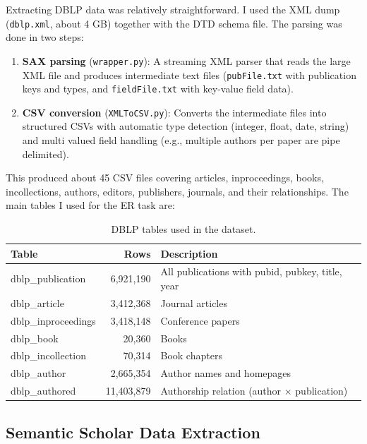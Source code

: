 \documentclass{article}
\begin{document}
Extracting DBLP data was relatively straightforward.
I used the XML dump (\texttt{dblp.xml}, about 4 GB) together with the DTD schema file.
The parsing was done in two steps:

\begin{enumerate}
    \item \textbf{SAX parsing} (\texttt{wrapper.py}): A streaming XML parser that reads the large XML file and produces intermediate text files (\texttt{pubFile.txt} with publication keys and types, and \texttt{fieldFile.txt} with key-value field data).
    \item \textbf{CSV conversion} (\texttt{XMLToCSV.py}): Converts the intermediate files into structured CSVs with automatic type detection (integer, float, date, string) and multi valued field handling (e.g., multiple authors per paper are pipe delimited).
\end{enumerate}

This produced about 45 CSV files covering articles, inproceedings, books, incollections, authors, editors, publishers, journals, and their relationships.
The main tables I used for the ER task are:

\begin{table}[h!]
\centering
\caption{DBLP tables used in the dataset.}
\label{tab:dblp_tables}
\begin{tabular}{lrp{7cm}}
\toprule
\textbf{Table} & \textbf{Rows} & \textbf{Description} \\
\midrule
dblp\_publication & 6,921,190 & All publications with pubid, pubkey, title, year \\
dblp\_article & 3,412,368 & Journal articles \\
dblp\_inproceedings & 3,418,148 & Conference papers \\
dblp\_book & 20,360 & Books \\
dblp\_incollection & 70,314 & Book chapters \\
dblp\_author & 2,665,354 & Author names and homepages \\
dblp\_authored & 11,403,879 & Authorship relation (author $\times$ publication) \\
\bottomrule
\end{tabular}
\end{table}

\subsection{Semantic Scholar Data Extraction}
\end{document}
